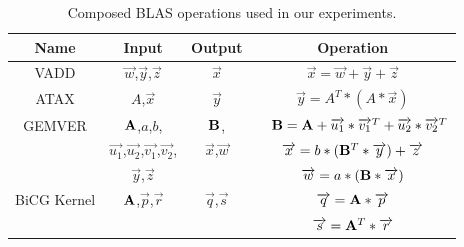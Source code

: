 \documentclass[runningheads]{llncs}
\begin{document}
\begin{table}[htb] 
\caption{Composed BLAS operations used in our experiments.}
\label{tbl:blas-ops}
\small
\centering 
\begin{tabular}{c c c c} 
\hline 
Name & Input & Output & Operation  \\ 
\hline 
VADD & $\overrightarrow{w}$,$\overrightarrow{y}$,$\overrightarrow{z}$ & $\overrightarrow{x}$ &
$\overrightarrow{x} = \overrightarrow{w} + \overrightarrow{y} + \overrightarrow{z}$ \\ [1ex]
ATAX & $A$,$\overrightarrow{x}$ & $\overrightarrow{y}$ & 
$\overrightarrow{y} = A^T * (A * \overrightarrow{x})$ \\ [1ex]
GEMVER & ${\bf A}$,$a$,$b$, &  ${\bf B}$,  & ~~${\bf B} = {\bf A} + \overrightarrow{u_1} * \overrightarrow{v_1}^T + \overrightarrow{u_2} * \overrightarrow{v_2}^T$\\
 & $\overrightarrow{u_1}$,$\overrightarrow{u_2}$,$\overrightarrow{v_1}$,$\overrightarrow{v_2}$, & $\overrightarrow{x}$,$\overrightarrow{w}$ & $\overrightarrow{x} = b * ({\bf B}^T * \overrightarrow{y}) + \overrightarrow{z}$\\
& $\overrightarrow{y}$,$\overrightarrow{z}$ &  & $\overrightarrow{w} = a * ({\bf B} * \overrightarrow{x})$\\ [1ex]
BiCG Kernel & ${\bf A}$,$\overrightarrow{p}$,$\overrightarrow{r}$ & $\overrightarrow{q}$,$\overrightarrow{s}$ & $\overrightarrow{q} = {\bf A} * \overrightarrow{p}$ \\ 
& & & $\overrightarrow{s} = {\bf A}^T * \overrightarrow{r}$\\
 
\hline 
\end{tabular} 
\vspace{-.1in} 
\end{table} 
\end{document}
